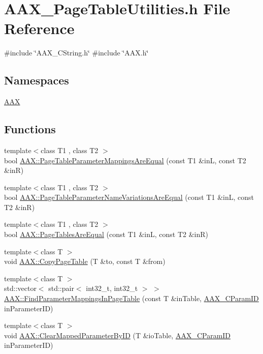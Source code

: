 \hypertarget{a00650}{}\section{A\+A\+X\+\_\+\+Page\+Table\+Utilities.\+h File Reference}
\label{a00650}
{\ttfamily \#include \char`\"{}A\+A\+X\+\_\+\+C\+String.\+h\char`\"{}}\newline
{\ttfamily \#include \char`\"{}A\+A\+X.\+h\char`\"{}}\newline
\subsection*{Namespaces}
\begin{DoxyCompactItemize}
\item 
 \mbox{\hyperlink{a00852}{A\+AX}}
\end{DoxyCompactItemize}
\subsection*{Functions}
\begin{DoxyCompactItemize}
\item 
{\footnotesize template$<$class T1 , class T2 $>$ }\\bool \mbox{\hyperlink{a00852_a6615318d686a57585ba69565f8e6a99b}{A\+A\+X\+::\+Page\+Table\+Parameter\+Mappings\+Are\+Equal}} (const T1 \&inL, const T2 \&inR)
\item 
{\footnotesize template$<$class T1 , class T2 $>$ }\\bool \mbox{\hyperlink{a00852_a2e75756c486e5db4ffa91579bb486a6a}{A\+A\+X\+::\+Page\+Table\+Parameter\+Name\+Variations\+Are\+Equal}} (const T1 \&inL, const T2 \&inR)
\item 
{\footnotesize template$<$class T1 , class T2 $>$ }\\bool \mbox{\hyperlink{a00852_a315085bafc0ddf4e7043a69d070da2fb}{A\+A\+X\+::\+Page\+Tables\+Are\+Equal}} (const T1 \&inL, const T2 \&inR)
\item 
{\footnotesize template$<$class T $>$ }\\void \mbox{\hyperlink{a00852_a99fe28eb20cfcef49e99710060c5ebe0}{A\+A\+X\+::\+Copy\+Page\+Table}} (T \&to, const T \&from)
\item 
{\footnotesize template$<$class T $>$ }\\std\+::vector$<$ std\+::pair$<$ int32\+\_\+t, int32\+\_\+t $>$ $>$ \mbox{\hyperlink{a00852_ac87bacdbc6323ab3f099c16ed8b508be}{A\+A\+X\+::\+Find\+Parameter\+Mappings\+In\+Page\+Table}} (const T \&in\+Table, \mbox{\hyperlink{a00392_a1440c756fe5cb158b78193b2fc1780d1}{A\+A\+X\+\_\+\+C\+Param\+ID}} in\+Parameter\+ID)
\item 
{\footnotesize template$<$class T $>$ }\\void \mbox{\hyperlink{a00852_ae583643c21c696c4d094a500b4e6d77e}{A\+A\+X\+::\+Clear\+Mapped\+Parameter\+By\+ID}} (T \&io\+Table, \mbox{\hyperlink{a00392_a1440c756fe5cb158b78193b2fc1780d1}{A\+A\+X\+\_\+\+C\+Param\+ID}} in\+Parameter\+ID)
\end{DoxyCompactItemize}

